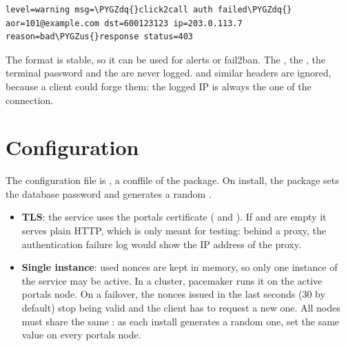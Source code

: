 \documentclass[letterpaper,10pt,english]{sphinxmanual}
\def\PYGZus{\char`\_}
\def\PYGZdq{\char`\"}
\begin{document}
\begin{Verbatim}[commandchars=\\\{\}]
level=warning msg=\PYGZdq{}click2call auth failed\PYGZdq{} aor=101@example.com dst=600123123 ip=203.0.113.7 reason=bad\PYGZus{}response status=403
\end{Verbatim}

The format is stable, so it can be used for alerts or fail2ban. The ,
the , the terminal password and the  are never logged.
 and similar headers are ignored, because a client could forge
them: the logged IP is always the one of the connection.


\section{Configuration}
\label{api_rest/click2call:configuration}
The configuration file is
, a
conffile of the  package. On install, the package sets
the database password and generates a random .
\begin{itemize}
\item {} 
\textbf{TLS}: the service uses the portals certificate
( and
). If  and 
are empty it serves plain HTTP, which is only meant for testing: behind a proxy,
the authentication failure log would show the IP address of the proxy.

\item {} 
\textbf{Single instance}: used nonces are kept in memory, so only one instance of the
service may be active. In a cluster, pacemaker runs it on the active portals node.
On a failover, the nonces issued in the last  seconds (30 by
default) stop being valid and the client has to request a new one. All nodes
must share the same : as each install generates a random one,
set the same value on every portals node.

\end{itemize}
\end{document}
